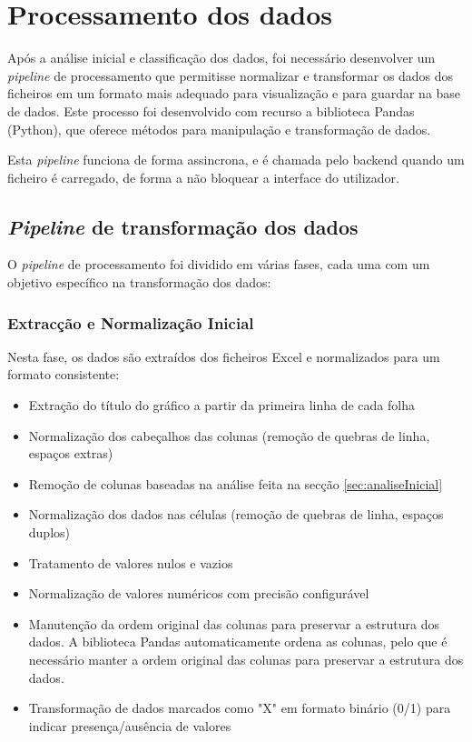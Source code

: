\section{Processamento dos dados}
Após a análise inicial e classificação dos dados, foi necessário desenvolver um \textit{pipeline} de processamento que permitisse normalizar e transformar os dados dos ficheiros em um formato mais adequado para visualização e para guardar na base de dados. Este processo foi desenvolvido com recurso a biblioteca Pandas (Python), que oferece métodos para manipulação e transformação de dados.

Esta \textit{pipeline} funciona de forma assincrona, e é chamada pelo backend quando um ficheiro é carregado, de forma a não bloquear a interface do utilizador.

\subsection{\textit{Pipeline} de transformação dos dados}
O \textit{pipeline} de processamento foi dividido em várias fases, cada uma com um objetivo específico na transformação dos dados:

\subsubsection{Extracção e Normalização Inicial}
Nesta fase, os dados são extraídos dos ficheiros Excel e normalizados para um formato consistente:
\begin{itemize}
    \item Extração do título do gráfico a partir da primeira linha de cada folha
    \item Normalização dos cabeçalhos das colunas (remoção de quebras de linha, espaços extras)
    \item Remoção de colunas baseadas na análise feita na secção \ref{sec:analiseInicial}
    \item Normalização dos dados nas células (remoção de quebras de linha, espaços duplos)
    \item Tratamento de valores nulos e vazios
    \item Normalização de valores numéricos com precisão configurável
    \item Manutenção da ordem original das colunas para preservar a estrutura dos dados. A biblioteca Pandas automaticamente ordena as colunas, pelo que é necessário manter a ordem original das colunas para preservar a estrutura dos dados.
    \item Transformação de dados marcados como "X" em formato binário (0/1) para indicar presença/ausência de valores
\end{itemize}

